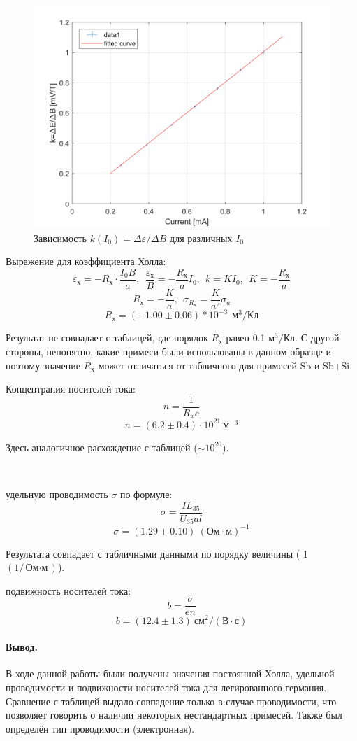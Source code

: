\documentclass{article}
\begin{document}
   \begin{figure}[ht]
   \centering
   \includegraphics[width=15cm]{plot2.png} 
   \caption{Зависимость $k(I_0) = \Delta\varepsilon / \Delta B$ для различных $I_0$} 
   \label{fig.exb3} 
   \end{figure}
   
   Выражение для коэффициента Холла:
   $$ \varepsilon_{\text{х}} = -R_{\text{х}} \cdot \frac{I_0B}{a},~~ \frac{\varepsilon_{\text{х}}}{B} = -\frac{R_{\text{х}}}{a} I_0,~~ k = KI_0,~~ K = - \frac{R_\text{х}}{a}$$ 
   $$ R_{\text{х}} = -\frac{K}{a},~~ \sigma_{R_\text{х}} = \frac{K}{a^2}\sigma_a $$
   $$ R_\text{х} = (-1.00 \pm 0.06)*10^{-3} ~~\text{м}^3 / \text{Кл} $$
   
	Результат не совпадает с таблицей, где порядок $R_\text{х}$ равен 0.1 $\text{м}^3 / \text{Кл}$. С другой стороны, непонятно, какие примеси были использованы в данном образце и поэтому значение $R_\text{х}$ может отличаться от табличного для примесей Sb и Sb+Si.
   
   Концентрания носителей тока:
   $$ n = \frac{1}{R_xe} $$
   $$ n = (6.2 \pm 0.4) \cdot 10^{21} ~ \text{м}^{-3} $$
   
   Здесь аналогичное расхождение с таблицей ($\sim 10^{20}$).

~

    удельную проводимость $\sigma$ по формуле:
   $$ \sigma = \frac{IL_{35}}{U_{35}al}$$
   $$ \sigma = (1.29 \pm 0.10)~ (\text{Ом$\cdot$м})^{-1} $$
 
 	Результата совпадает с табличными данными по порядку величины ( 1 $(1/\text{Ом$\cdot$м})$).

    подвижность носителей тока:
   $$ b = \frac{\sigma}{en}$$
   $$ b = (12.4 \pm 1.3)~ \text{см}^2 / (\text{В} \cdot \text{с}) $$
   

   \paragraph*{Вывод.} В ходе данной работы были получены значения постоянной Холла, удельной проводимости и подвижности носителей тока для легированного германия. Сравнение с таблицей выдало совпадение только  в случае проводимости, что позволяет говорить о наличии некоторых нестандартных примесей. Также был определён тип проводимости (электронная).
\end{document}
